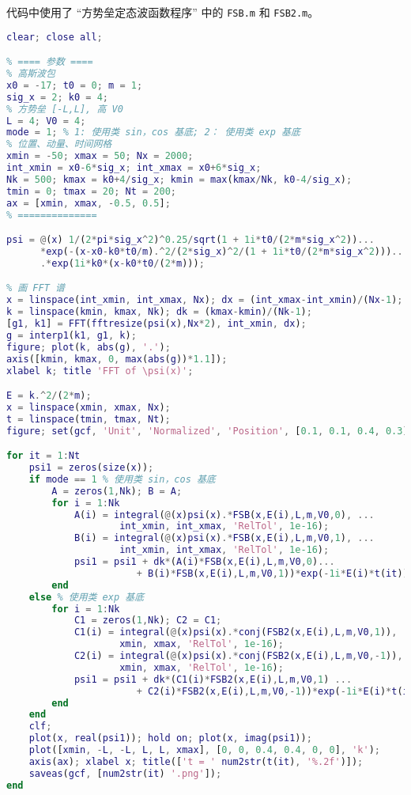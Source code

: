 代码中使用了 “方势垒定态波函数程序” 中的 \verb|FSB.m| 和 \verb|FSB2.m|。
\begin{lstlisting}[language=matlab, caption=FSBsct.m]
% 方势垒散射高斯波包
clear; close all;

% ==== 参数 ====
% 高斯波包
x0 = -17; t0 = 0; m = 1;
sig_x = 2; k0 = 4;
% 方势垒 [-L,L], 高 V0
L = 4; V0 = 4;
mode = 1; % 1: 使用类 sin，cos 基底; 2： 使用类 exp 基底
% 位置、动量、时间网格
xmin = -50; xmax = 50; Nx = 2000;
int_xmin = x0-6*sig_x; int_xmax = x0+6*sig_x;
Nk = 500; kmax = k0+4/sig_x; kmin = max(kmax/Nk, k0-4/sig_x);
tmin = 0; tmax = 20; Nt = 200;
ax = [xmin, xmax, -0.5, 0.5];
% ==============

psi = @(x) 1/(2*pi*sig_x^2)^0.25/sqrt(1 + 1i*t0/(2*m*sig_x^2))...
      *exp(-(x-x0-k0*t0/m).^2/(2*sig_x)^2/(1 + 1i*t0/(2*m*sig_x^2)))...
      .*exp(1i*k0*(x-k0*t0/(2*m)));

% 画 FFT 谱
x = linspace(int_xmin, int_xmax, Nx); dx = (int_xmax-int_xmin)/(Nx-1);
k = linspace(kmin, kmax, Nk); dk = (kmax-kmin)/(Nk-1);
[g1, k1] = FFT(fftresize(psi(x),Nx*2), int_xmin, dx);
g = interp1(k1, g1, k);
figure; plot(k, abs(g), '.');
axis([kmin, kmax, 0, max(abs(g))*1.1]);
xlabel k; title 'FFT of \psi(x)';

E = k.^2/(2*m);
x = linspace(xmin, xmax, Nx);
t = linspace(tmin, tmax, Nt);
figure; set(gcf, 'Unit', 'Normalized', 'Position', [0.1, 0.1, 0.4, 0.3]);

for it = 1:Nt
    psi1 = zeros(size(x));
    if mode == 1 % 使用类 sin，cos 基底
        A = zeros(1,Nk); B = A;
        for i = 1:Nk
            A(i) = integral(@(x)psi(x).*FSB(x,E(i),L,m,V0,0), ...
                    int_xmin, int_xmax, 'RelTol', 1e-16);
            B(i) = integral(@(x)psi(x).*FSB(x,E(i),L,m,V0,1), ...
                    int_xmin, int_xmax, 'RelTol', 1e-16);
            psi1 = psi1 + dk*(A(i)*FSB(x,E(i),L,m,V0,0)...
                       + B(i)*FSB(x,E(i),L,m,V0,1))*exp(-1i*E(i)*t(it));
        end
    else % 使用类 exp 基底
        for i = 1:Nk
            C1 = zeros(1,Nk); C2 = C1;
            C1(i) = integral(@(x)psi(x).*conj(FSB2(x,E(i),L,m,V0,1)), ...
                    xmin, xmax, 'RelTol', 1e-16);
            C2(i) = integral(@(x)psi(x).*conj(FSB2(x,E(i),L,m,V0,-1)), ...
                    xmin, xmax, 'RelTol', 1e-16);
            psi1 = psi1 + dk*(C1(i)*FSB2(x,E(i),L,m,V0,1) ...
                       + C2(i)*FSB2(x,E(i),L,m,V0,-1))*exp(-1i*E(i)*t(it));
        end
    end
    clf;
    plot(x, real(psi1)); hold on; plot(x, imag(psi1));
    plot([xmin, -L, -L, L, L, xmax], [0, 0, 0.4, 0.4, 0, 0], 'k');
    axis(ax); xlabel x; title(['t = ' num2str(t(it), '%.2f')]);
    saveas(gcf, [num2str(it) '.png']);
end
\end{lstlisting}
